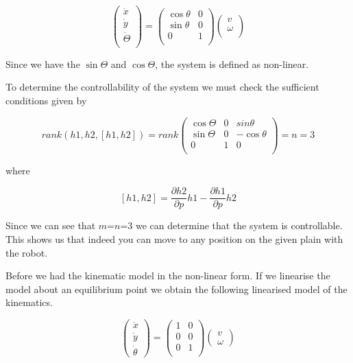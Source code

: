\begin{equation} \label{eq74}
\begin{pmatrix} 
 \dot{x} \\ 
 \dot{y} \\
 \dot{\Theta}\\
 \end{pmatrix} 
 =
 \begin{pmatrix}  
 \cos\theta   & 0 \\ 
 \sin\theta & 0 \\
 0 & 1\\ 
 \end{pmatrix}
 \begin{pmatrix} 
 v \\ 
 \omega\\
 \end{pmatrix} 
\end{equation}

Since we have the $\sin\Theta$ and $\cos\Theta$, the system is defined as non-linear.

To determine the controllability of the system we must check the sufficient conditions given by

\begin{equation} \label{eq75}
rank(h1,h2,[h1,h2])
=
rank
\begin{pmatrix} 
 \cos\Theta & 0 & sin\theta\\ 
 \sin\Theta & 0 & -\cos\theta\\
 0 & 1 & 0\\
 \end{pmatrix} 
=
n
=
3
\end{equation}

where

\begin{equation} \label{eq76}
[h1,h2]
=
\frac{\partial h2}{\partial p}h1
-
\frac{\partial h1}{\partial p}h2
\end{equation}

Since we can see that $m$=$n$=3 we can determine that the system is controllable.  This shows us that indeed you can move to any position on the given plain with the robot.

Before we had the kinematic model in the non-linear form. If we linearise the model about an equilibrium point we obtain the following linearised model of the kinematics.

\begin{equation}
\begin{pmatrix}
\dot{x} \\
\dot{y} \\
\dot{\theta}
\end{pmatrix}
=
\begin{pmatrix}
1 & 0 \\
0 & 0 \\
0 & 1 \\
\end{pmatrix}
\begin{pmatrix}
v \\
\omega
\end{pmatrix}
\end{equation}

